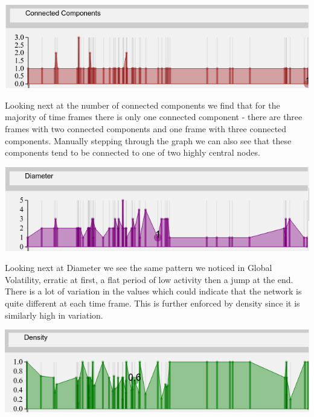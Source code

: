 \begin{center}
\includegraphics[trim={0 0 0 0}, width=140mm]{./Figures/marieBoucherConnectedComponents.png}
\end{center}
Looking next at the number of connected components we find that for the majority of time frames there is only one connected component - there are three frames with two connected components and one frame with three connected components. Manually stepping through the graph we can also see that these components tend to be connected to one of two highly central nodes.

\begin{center}
\includegraphics[trim={0 0 0 0}, width=140mm]{./Figures/marieBoucherDiameter.png}
\end{center}
Looking next at Diameter we see the same pattern we noticed in Global Volatility, erratic at first, a flat period of low activity then a jump at the end. There is a lot of variation in the values which could indicate that the network is quite different at each time frame. This is further enforced by density since it is similarly high in variation.

\begin{center}
\includegraphics[trim={0 0 0 0}, width=140mm]{./Figures/marieBoucherDensity.png}
\end{center}


